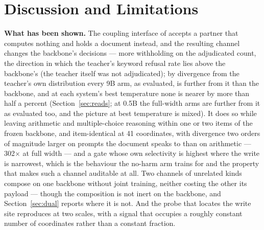 \documentclass[11pt]{article}
\newcommand{\companion}{\citet{furui2026psilm}}
\begin{document}
\section{Discussion and Limitations}
\label{sec:discussion2}

\textbf{What has been shown.} The coupling interface of \companion{} accepts a
partner that computes nothing and holds a document instead, and the resulting
channel changes the backbone's decisions --- more withholding on the adjudicated
count, the direction in which the teacher's keyword refusal rate lies above the
backbone's (the teacher itself was not adjudicated); by divergence from the
teacher's own distribution every 9B arm, as evaluated, is further from it than the
backbone, and at each system's best temperature none is nearer by more than half a
percent (Section~\ref{sec:reads}; at 0.5B the full-width arms are further from it
as evaluated too, and the picture at best temperature is mixed). It does so while leaving arithmetic and multiple-choice reasoning
within one or two items of the frozen backbone, and item-identical at 41 coordinates,
with divergence two orders of magnitude larger on prompts the document speaks to than
on arithmetic --- 302$\times$ at full width --- and a gate whose own selectivity is
highest where the write is narrowest, which is the behaviour the no-harm arm trains
for and the property that makes such a channel auditable at all. Two channels of
unrelated kinds compose on one backbone without joint training, neither costing the
other its payload --- though the composition is not inert on the backbone, and
Section~\ref{sec:dual} reports where it is not. And the probe that
locates the write site reproduces at two scales, with a signal that occupies a
roughly constant number of coordinates rather than a constant fraction.
\end{document}
